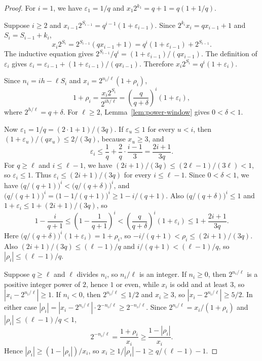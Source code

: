 \documentclass[11pt]{article}
\begin{document}
\begin{proof}
For $i = 1$, we have $\varepsilon_1 = 1/q$ and $x_1 2^{k_1} = q + 1 = q(1 + 1/q)$.

Suppose $i \ge 2$ and $x_{i-1} 2^{S_{i-1}} = q^{i-1}(1 + \varepsilon_{i-1})$.
Since $2^{k_i} x_i = q x_{i-1} + 1$ and $S_i = S_{i-1} + k_i$,
\[
x_i 2^{S_i} = 2^{S_{i-1}}(q x_{i-1} + 1) = q^i(1 + \varepsilon_{i-1}) + 2^{S_{i-1}}.
\]
The inductive equation gives $2^{S_{i-1}}/q^i = (1 + \varepsilon_{i-1})/(q x_{i-1})$.
The definition of $\varepsilon_i$ gives $\varepsilon_i = \varepsilon_{i-1} + (1 + \varepsilon_{i-1})/(q x_{i-1})$.
Therefore $x_i 2^{S_i} = q^i(1 + \varepsilon_i)$.

Since $n_i = ih - \ell S_i$ and $x_i = 2^{n_i/\ell}(1 + \rho_i)$,
\[
1 + \rho_i = \frac{x_i 2^{S_i}}{2^{ih/\ell}} = \left(\frac{q}{q+\delta}\right)^i (1 + \varepsilon_i),
\]
where $2^{h/\ell} = q + \delta$.
For $\ell \ge 2$, Lemma~\ref{lem:power-window} gives $0 < \delta < 1$.

Now $\varepsilon_1 = 1/q = (2\cdot 1 + 1)/(3q)$.
If $\varepsilon_u \le 1$ for every $u < i$, then $(1 + \varepsilon_u)/(q x_u) \le 2/(3q)$, because $x_u \ge 3$, and
\[
\varepsilon_i \le \frac{1}{q} + \frac{2}{q}\cdot\frac{i-1}{3} = \frac{2i+1}{3q}.
\]
For $q \ge \ell$ and $i \le \ell - 1$, we have $(2i+1)/(3q) \le (2\ell - 1)/(3\ell) < 1$, so $\varepsilon_i \le 1$.
Thus $\varepsilon_i \le (2i+1)/(3q)$ for every $i \le \ell - 1$.
Since $0 < \delta < 1$, we have $\bigl(q/(q+1)\bigr)^i < \bigl(q/(q+\delta)\bigr)^i$, and $\bigl(q/(q+1)\bigr)^i = \bigl(1 - 1/(q+1)\bigr)^i \ge 1 - i/(q+1)$.
Also $\bigl(q/(q+\delta)\bigr)^i \le 1$ and $1 + \varepsilon_i \le 1 + (2i+1)/(3q)$, so
\[
1 - \frac{i}{q+1} \le \left(1 - \frac{1}{q+1}\right)^i < \left(\frac{q}{q+\delta}\right)^i (1 + \varepsilon_i) \le 1 + \frac{2i+1}{3q}.
\]
Here $\bigl(q/(q+\delta)\bigr)^i (1 + \varepsilon_i) = 1 + \rho_i$, so $-i/(q+1) < \rho_i \le (2i+1)/(3q)$.
Also $(2i+1)/(3q) \le (\ell-1)/q$ and $i/(q+1) < (\ell-1)/q$, so $|\rho_i| \le (\ell-1)/q$.

Suppose $q \ge \ell$ and $\ell$ divides $n_i$, so $n_i/\ell$ is an integer.
If $n_i \ge 0$, then $2^{n_i/\ell}$ is a positive integer power of $2$, hence $1$ or even, while $x_i$ is odd and at least $3$, so $|x_i - 2^{n_i/\ell}| \ge 1$.
If $n_i < 0$, then $2^{n_i/\ell} \le 1/2$ and $x_i \ge 3$, so $|x_i - 2^{n_i/\ell}| \ge 5/2$.
In either case $|\rho_i| = |x_i - 2^{n_i/\ell}| \cdot 2^{-n_i/\ell} \ge 2^{-n_i/\ell}$.
Since $2^{n_i/\ell} = x_i/(1+\rho_i)$ and $|\rho_i| \le (\ell-1)/q < 1$,
\[
2^{-n_i/\ell} = \frac{1+\rho_i}{x_i} \ge \frac{1 - |\rho_i|}{x_i}.
\]
Hence $|\rho_i| \ge (1 - |\rho_i|)/x_i$, so $x_i \ge 1/|\rho_i| - 1 \ge q/(\ell-1) - 1$.
\end{proof}
\end{document}
